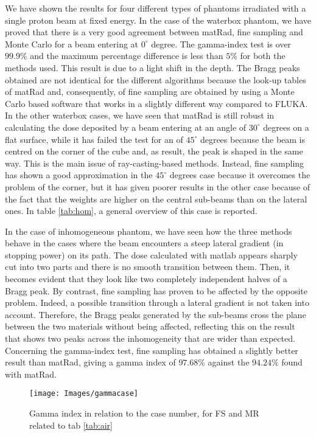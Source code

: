 \documentclass[12pt, a4paper, twoside]{book}
\begin{document}
We have shown the results for four different types of phantoms irradiated with a single proton beam at fixed energy.
In the case of the waterbox phantom, we have proved that there is a very good agreement between matRad, fine sampling and Monte Carlo for a beam entering at $0^\circ$ degree. The gamma-index test is over $99.9\%$ and the maximum percentage difference is less than $5\%$ for both the methods used. This result is due to a light shift in the depth.
The Bragg peaks obtained are not identical for the different algorithms because the look-up tables of matRad and, consequently, of fine sampling are obtained by using a Monte Carlo based software that works in a slightly different way compared to FLUKA.
In the other waterbox cases, we have seen that matRad is still robust in calculating the dose deposited by a beam entering at an angle of $30^\circ$ degrees on a flat surface, while it has failed the test for an  of $45^\circ$ degrees because the beam is centred on the corner of the cube and, as result, the peak is shaped in the same way. This is the main issue of ray-casting-based methods. Instead, fine sampling has shown a good approximation in the $45^\circ$ degrees case because it overcomes the problem of the corner, but it has given poorer results in the other case because of the fact that the weights are higher on the central sub-beams than on the lateral ones. In table \ref{tab:hom}, a general overview of this case is reported.

In the case of inhomogeneous phantom, we have seen how the three methods behave in the cases where the beam encounters a steep lateral gradient (in stopping power) on its path. The dose calculated with matlab appears sharply cut into two parts and there is no smooth transition between them. Then, it becomes evident that they look like two completely independent halves of a Bragg peak.
By contrast, fine sampling has proven to be affected by the opposite problem. Indeed, a possible transition through a lateral gradient is not taken into account. Therefore, the Bragg peaks generated by the sub-beams cross the plane between the two materials without being affected, reflecting this on the result that shows two peaks across the inhomogeneity that are wider than expected. Concerning the gamma-index test, fine sampling has obtained a slightly better result than matRad, giving a gamma index of $97.68\%$ against the $94.24\%$ found with matRad.

\begin{figure}[!t]
\centering
{\texttt{[image: Images/gammacase]}} 
\caption{Gamma index in relation to the case number, for FS and MR related to tab \ref{tab:air}}
\label{fig:gamcase}
\end{figure}
\end{document}
